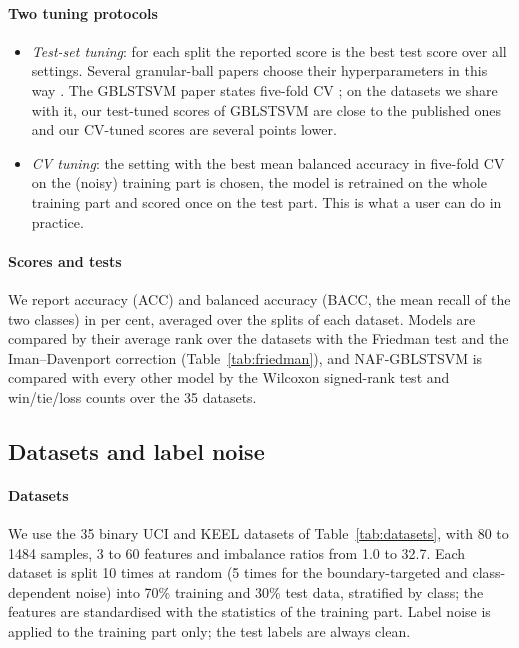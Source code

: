\documentclass[preprint,12pt]{elsarticle}
\newcommand{\NAF}{NAF-GBLSTSVM}
\begin{document}
\paragraph{Two tuning protocols}
\begin{itemize}
\item \emph{Test-set tuning}: for each split the reported score is the best test score over all settings. Several granular-ball papers choose their hyperparameters in this way \cite{xia2024gbfsvm,lang2025gbftsvm}. The GBLSTSVM paper states five-fold CV \cite{tanveer2024gblstsvm}; on the datasets we share with it, our test-tuned scores of GBLSTSVM are close to the published ones and our CV-tuned scores are several points lower.
\item \emph{CV tuning}: the setting with the best mean balanced accuracy in five-fold CV on the (noisy) training part is chosen, the model is retrained on the whole training part and scored once on the test part. This is what a user can do in practice.
\end{itemize}

\paragraph{Scores and tests} We report accuracy (ACC) and balanced accuracy (BACC, the mean recall of the two classes) in per cent, averaged over the splits of each dataset. Models are compared by their average rank over the datasets with the Friedman test and the Iman--Davenport correction \cite{demsar2006,iman1980} (Table~\ref{tab:friedman}), and \NAF{} is compared with every other model by the Wilcoxon signed-rank test and win/tie/loss counts over the 35 datasets.

\subsection{Datasets and label noise}
\label{sec:setup}

\paragraph{Datasets} We use the 35 binary UCI \cite{uci} and KEEL \cite{keel} datasets of Table~\ref{tab:datasets}, with 80 to 1484 samples, 3 to 60 features and imbalance ratios from 1.0 to 32.7. Each dataset is split 10 times at random (5 times for the boundary-targeted and class-dependent noise) into 70\% training and 30\% test data, stratified by class; the features are standardised with the statistics of the training part. Label noise is applied to the training part only; the test labels are always clean.
\end{document}
